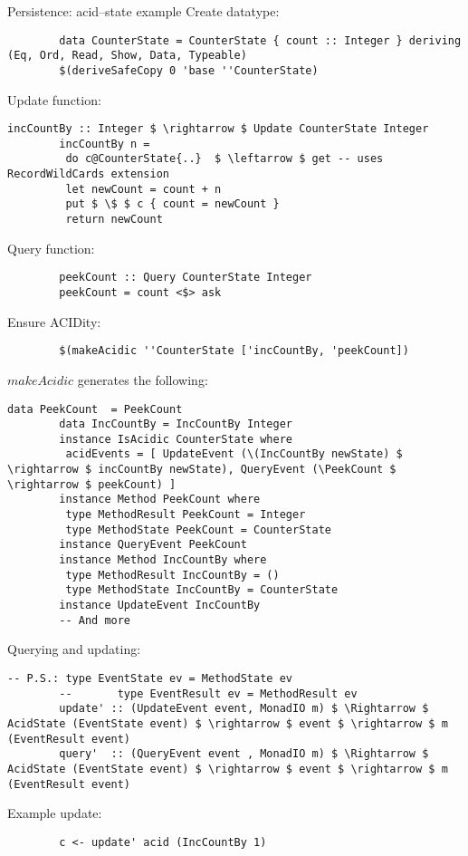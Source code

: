 \documentclass[10pt,usenames,dvipsnames]{beamer}
\begin{document}
	\begin{frame}[fragile]{Persistence: acid--state example}
		Create datatype:
		\begin{lstlisting}
		data CounterState = CounterState { count :: Integer } deriving (Eq, Ord, Read, Show, Data, Typeable)
		$(deriveSafeCopy 0 'base ''CounterState)
		\end{lstlisting}
		Update function:
		\begin{lstlisting}[mathescape=true]
		incCountBy :: Integer $ \rightarrow $ Update CounterState Integer
		incCountBy n =
		 do c@CounterState{..}  $ \leftarrow $ get -- uses RecordWildCards extension
		 let newCount = count + n
		 put $ \$ $ c { count = newCount }
		 return newCount
		\end{lstlisting}
		Query function:
		\begin{lstlisting}
		peekCount :: Query CounterState Integer
		peekCount = count <$> ask
		\end{lstlisting}
		Ensure ACIDity:
		\begin{lstlisting}
		$(makeAcidic ''CounterState ['incCountBy, 'peekCount])
		\end{lstlisting}
	\end{frame}

	\begin{frame}[fragile]
		$ makeAcidic $ generates the following:
		\begin{lstlisting}[mathescape=true]
		data PeekCount  = PeekCount
		data IncCountBy = IncCountBy Integer
		instance IsAcidic CounterState where
		 acidEvents = [ UpdateEvent (\(IncCountBy newState) $ \rightarrow $ incCountBy newState), QueryEvent (\PeekCount $ \rightarrow $ peekCount) ]
		instance Method PeekCount where
		 type MethodResult PeekCount = Integer
		 type MethodState PeekCount = CounterState
		instance QueryEvent PeekCount
		instance Method IncCountBy where
		 type MethodResult IncCountBy = ()
		 type MethodState IncCountBy = CounterState
		instance UpdateEvent IncCountBy
		-- And more
		\end{lstlisting}
		Querying and updating:
		\begin{lstlisting}[mathescape=true]
		-- P.S.: type EventState ev = MethodState ev
		--       type EventResult ev = MethodResult ev
		update' :: (UpdateEvent event, MonadIO m) $ \Rightarrow $ AcidState (EventState event) $ \rightarrow $ event $ \rightarrow $ m (EventResult event)
		query'  :: (QueryEvent event , MonadIO m) $ \Rightarrow $ AcidState (EventState event) $ \rightarrow $ event $ \rightarrow $ m (EventResult event)
		\end{lstlisting}
		Example update:
		\begin{lstlisting}
		c <- update' acid (IncCountBy 1)
		\end{lstlisting}
	\end{frame}	
\end{document}
